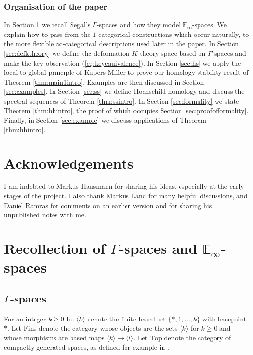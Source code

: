 \documentclass[oneside, a4paper, 12pt]{article}
\numberwithin{equation}{section}
\newcommand{\Topp}{\mathrm{Top}}
\newcommand{\Fin}{\mathrm{Fin}}
\theoremstyle{plain}
\theoremstyle{definition}
\theoremstyle{remark}
\begin{document}
\subsubsection*{Organisation of the paper}

In Section \ref{sec:gammaspace} we recall Segal's $\Gamma$-spaces and how they model $\mathbb{E}_\infty$-spaces. We explain how to pass from the $1$-categorical constructions which occur naturally, to the more flexible $\infty$-categorical descriptions used later in the paper. In Section \ref{sec:defktheory} we define the deformation $K$-theory space based on $\Gamma$-spaces and make the key observation (\ref{eq:keyequivalence}). In Section \ref{sec:hs} we apply the local-to-global principle of Kupers-Miller to prove our homology stability result of Theorem \ref{thm:main1intro}. Examples are then discussed in Section \ref{sec:examples}. In Section \ref{sec:ss} we define Hochschild homology and discuss the spectral sequences of Theorem \ref{thm:ssintro}. In Section \ref{sec:formality} we state Theorem \ref{thm:hhintro}, the proof of which occupies Section \ref{sec:proofofformality}. Finally, in Section \ref{sec:example} we discuss applications of Theorem \ref{thm:hhintro}.

\section*{Acknowledgements}

I am indebted to Markus Hausmann for sharing his ideas, especially at the early stages of the project. I also thank Markus Land for many helpful discussions, and Daniel Ramras for comments on an earlier version and for sharing his unpublished notes with me.




\section{Recollection of $\Gamma$-spaces and $\mathbb{E}_\infty$-spaces} \label{sec:gammaspace}

\subsection{$\Gamma$-spaces}

For an integer $k\geq 0$ let $\langle k\rangle$ denote the finite based set $\{\ast,1,\dots,k\}$ with basepoint $\ast$. Let $\Fin_\ast$ denote the category whose objects are the sets $\langle k\rangle$ for $k\geq 0$ and whose morphisms are based maps $\langle k\rangle \to \langle l\rangle$. Let $\Topp$ denote the category of compactly generated spaces, as defined for example in \cite[Appendix A]{Global}.
\end{document}
